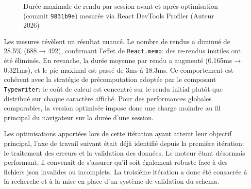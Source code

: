 \begin{figure}[H]
    \centering
    \caption{Durée maximale de \gls{rendu} par session avant et après optimisation (commit \texttt{9831b9e}) mesurée via React DevTools Profiler (Auteur 2026)}
    \label{fig:profiling_maxdur}
\end{figure}

Les mesures révèlent un résultat nuancé. Le nombre de \glspl{rendu} a diminué de 28.5\% (688 → 492), confirmant l'effet de \texttt{React.memo}: des re-rendus inutiles ont été éliminés. En revanche, la durée moyenne par \gls{rendu} a augmenté (0.165ms → 0.321ms), et le pic maximal est passé de 3ms à 18.3ms. Ce comportement est cohérent avec la stratégie de précomputation adoptée par le composant \texttt{Typewriter}: le coût de calcul est concentré sur le \gls{rendu} initial plutôt que distribué sur chaque caractère affiché. Pour des performances globales comparables, la version optimisée impose donc une charge moindre au fil principal du navigateur sur la durée d'une session.



Les optimisations apportées lors de cette itération ayant atteint leur objectif principal, l'axe de travail suivant était déjà identifié depuis la première itération: le traitement des erreurs et la validation des données. Le moteur étant désormais performant, il convenait de s'assurer qu'il soit également robuste face à des fichiers \gls{json} invalides ou incomplets. La troisième itération a donc été consacrée à la recherche et à la mise en place d'un système de validation du \gls{schema}.



